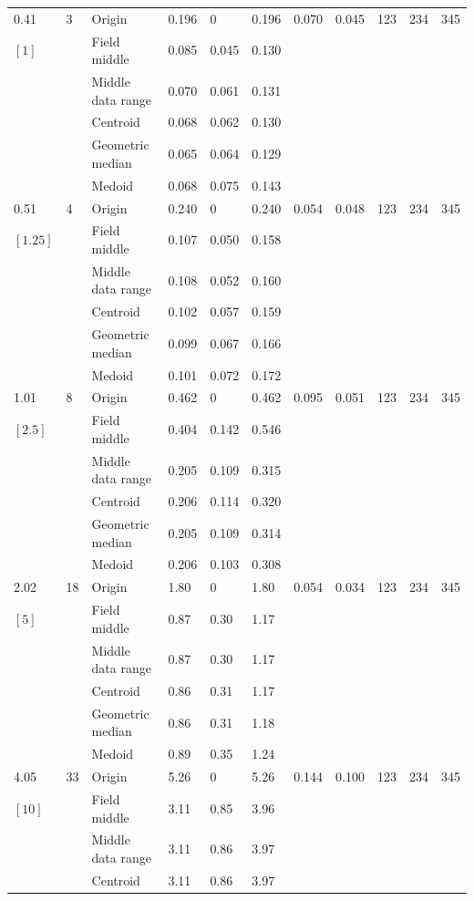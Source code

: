 \documentclass[phd,showframe]{ndsu-thesis-2022}
\begin{document}
\begin{landscape}
{{\begin{ThreePartTable}
\begin{longtable}{lll lll ll rrr}
0.41 & 3 & Origin  & 0.196 & 0 & 0.196 & 0.070 & 0.045 & 123 & 234 & 345\\
$[1]$ &  & Field middle  & 0.085 & 0.045 & 0.130 \\
 &  & Middle data range  & 0.070 & 0.061 & 0.131 \\
 &  & Centroid & 0.068 & 0.062 & 0.130 \\
 &  & Geometric median & 0.065 & 0.064 & 0.129 \\
 &  & Medoid  & 0.068 & 0.075 & 0.143 \\
\midrule
0.51 & 4 & Origin  & 0.240 & 0 & 0.240 & 0.054 & 0.048 & 123 & 234 & 345\\
$[1.25]$ &  & Field middle  & 0.107 & 0.050 & 0.158 \\
 &  & Middle data range  & 0.108 & 0.052 & 0.160 \\
 &  & Centroid & 0.102 & 0.057 & 0.159 \\
 &  & Geometric median & 0.099 & 0.067 & 0.166 \\
 &  & Medoid  & 0.101 & 0.072 & 0.172 \\
\midrule
1.01 & 8 & Origin  & 0.462 & 0 & 0.462 & 0.095 & 0.051  & 123 & 234 & 345\\
$[2.5]$ &  & Field middle  & 0.404 & 0.142 & 0.546 \\
 &  & Middle data range  & 0.205 & 0.109 & 0.315 \\
 &  & Centroid & 0.206 & 0.114 & 0.320 \\
 &  & Geometric median & 0.205 & 0.109 & 0.314 \\
 &  & Medoid  & 0.206 & 0.103 & 0.308 \\
\midrule
2.02 & 18 & Origin  & 1.80 & 0 & 1.80 & 0.054 & 0.034 & 123 & 234 & 345 \\
$[5]$ &  & Field middle  & 0.87 & 0.30 & 1.17 \\
 &  & Middle data range  & 0.87 & 0.30 & 1.17 \\
 &  & Centroid & 0.86 & 0.31 & 1.17 \\
 &  & Geometric median & 0.86 & 0.31 & 1.18 \\
 &  & Medoid  & 0.89 & 0.35 & 1.24 \\
\midrule
4.05 & 33 & Origin  & 5.26 & 0 & 5.26 & 0.144 & 0.100 & 123 & 234 & 345 \\
$[10]$ &  & Field middle  & 3.11 & 0.85 & 3.96 \\
 &  & Middle data range  & 3.11 & 0.86 & 3.97 \\
 &  & Centroid & 3.11 & 0.86 & 3.97 \\

\end{longtable}
\end{ThreePartTable}}}
\end{landscape}
\end{document}
